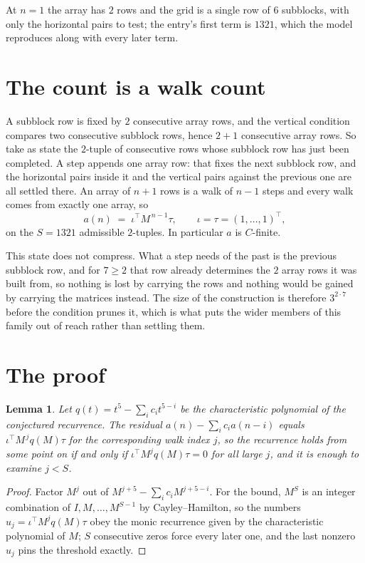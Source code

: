 \documentclass[11pt,a4paper]{article}
\theoremstyle{plain}
\newtheorem{lemma}[theorem]{Lemma}
\theoremstyle{definition}
\begin{document}
At $n=1$ the array has $2$ rows and the grid is a single row of $6$
subblocks, with only the horizontal pairs to test; the entry's first term is
$1321$, which the model reproduces along with every later term.

\section{The count is a walk count}

A subblock row is fixed by $2$ consecutive array rows, and the vertical condition compares
two consecutive subblock rows, hence $2+1$ consecutive array rows. So take as state the
$2$-tuple of consecutive rows whose subblock row has just been completed. A step appends one
array row: that fixes the next subblock row, and the horizontal pairs inside it and the
vertical pairs against the previous one are all settled there. An array of $n+1$ rows is
a walk of $n-1$ steps and every walk comes from exactly one array, so
\[
a(n)\;=\;\iota^{\!\top}M^{\,n-1}\tau,\qquad\iota=\tau=(1,\dots,1)^{\!\top},
\]
on the $S=1321$ admissible $2$-tuples. In particular $a$ is $C$-finite.

This state does not compress. What a step needs of the past is the previous subblock row, and
for $7\ge2$ that row already determines the $2$ array rows it was built from, so nothing
is lost by carrying the rows and nothing would be gained by carrying the matrices instead. The
size of the construction is therefore $3^{2\cdot7}$ before the condition prunes
it, which is what puts the wider members of this family out of reach rather than settling them.

\section{The proof}

\begin{lemma}\label{lem:crit}
Let $q(t)=t^{5}-\sum_i c_it^{5-i}$ be the characteristic polynomial of the
conjectured recurrence. The residual $a(n)-\sum_ic_ia(n-i)$ equals
$\iota^{\!\top}M^{\,j}q(M)\tau$ for the corresponding walk index $j$, so the recurrence
holds from some point on if and only if $\iota^{\!\top}M^{j}q(M)\tau=0$ for all large $j$,
and it is enough to examine $j<S$.
\end{lemma}

\begin{proof}
Factor $M^{j}$ out of $M^{j+5}-\sum_ic_iM^{j+5-i}$. For the bound, $M^{S}$
is an integer combination of $I,M,\dots,M^{S-1}$ by Cayley--Hamilton, so the numbers
$u_j=\iota^{\!\top}M^{j}q(M)\tau$ obey the monic recurrence given by the characteristic
polynomial of $M$; $S$ consecutive zeros force every later one, and the last nonzero $u_j$
pins the threshold exactly.
\end{proof}
\end{document}
